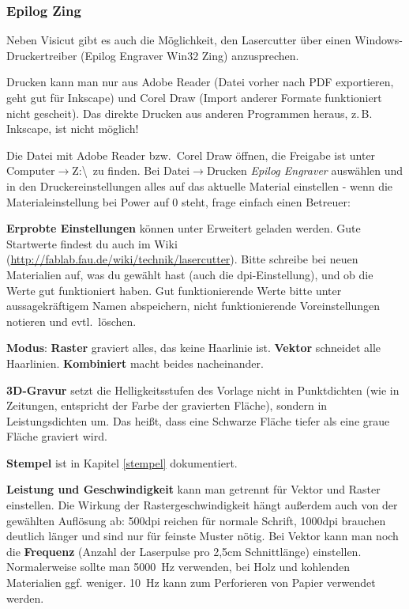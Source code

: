 \documentclass{\basedir/fablab-document}
\renewcommand{\todo}[1]{\textbf{\color{red}{TODO: #1}}}
\begin{document}
	\todo{...}

	\subsubsection{Epilog Zing}

	Neben Visicut gibt es auch die Möglichkeit, den Lasercutter über einen Windows-Druckertreiber (Epilog Engraver Win32 Zing) anzusprechen.

	Drucken kann man nur aus Adobe Reader (Datei vorher nach PDF exportieren, geht gut für Inkscape) und Corel Draw (Import anderer Formate funktioniert nicht gescheit).  Das direkte Drucken aus anderen Programmen heraus, z.\,B. Inkscape, ist nicht möglich!

	Die Datei mit Adobe Reader bzw.\  Corel Draw öffnen, die Freigabe ist unter Computer$\rightarrow$Z:\textbackslash \ zu finden. Bei Datei$\rightarrow$Drucken \textit{Epilog Engraver} auswählen und in den Druckereinstellungen alles auf das aktuelle Material einstellen - wenn die Materialeinstellung bei Power auf 0 steht, frage einfach einen Betreuer:

	\textbf{Erprobte Einstellungen} können unter Erweitert geladen werden. Gute Startwerte findest du auch im Wiki (\url{http://fablab.fau.de/wiki/technik/lasercutter}). Bitte schreibe bei neuen Materialien auf, was du gewählt hast (auch die dpi-Einstellung), und ob die Werte gut funktioniert haben. Gut funktionierende Werte bitte unter aussagekräftigem Namen abspeichern, nicht funktionierende Voreinstellungen notieren und evtl.\  löschen.

	\textbf{Modus}: \textbf{Raster} graviert alles, das keine Haarlinie ist. \textbf{Vektor} schneidet alle Haarlinien. \textbf{Kombiniert} macht beides nacheinander.

	\textbf{3D-Gravur} setzt die Helligkeitsstufen des Vorlage nicht in Punktdichten (wie in Zeitungen, entspricht der Farbe der gravierten Fläche), sondern in Leistungsdichten um. Das heißt, dass eine Schwarze Fläche tiefer als eine graue Fläche graviert wird.

	\textbf{Stempel} ist in Kapitel \ref{stempel} dokumentiert.

	\textbf{Leistung und Geschwindigkeit} kann man getrennt für Vektor und Raster einstellen. Die Wirkung der Rastergeschwindigkeit hängt außerdem auch von der gewählten Auflösung ab: 500dpi reichen für normale Schrift, 1000dpi brauchen deutlich länger und sind nur für feinste Muster nötig. Bei Vektor kann man noch die \textbf{Frequenz} (Anzahl der Laserpulse pro 2,5cm Schnittlänge) einstellen. Normalerweise sollte man 5000~Hz verwenden, bei Holz und kohlenden Materialien ggf. weniger. 10~Hz kann zum Perforieren von Papier verwendet werden. %
\end{document}

